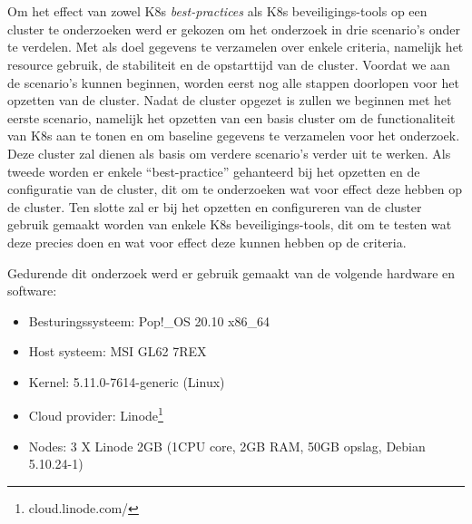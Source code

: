 
\chapter{}
\label{ch:methodologie}

Om het effect van zowel K8s \textit{best-practices} als K8s beveiligings-tools op een cluster te onderzoeken werd er gekozen om het onderzoek in drie scenario's onder te verdelen. Met als doel gegevens te verzamelen over enkele criteria, namelijk het resource gebruik, de stabiliteit en de opstarttijd van de cluster. Voordat we aan de scenario's kunnen beginnen, worden eerst nog alle stappen doorlopen voor het opzetten van de cluster. Nadat de cluster opgezet is zullen we beginnen met het eerste scenario, namelijk het opzetten van een basis cluster om de functionaliteit van K8s aan te tonen en om baseline gegevens te verzamelen voor het onderzoek. Deze cluster zal dienen als basis om verdere scenario's verder uit te werken. Als tweede worden er enkele ``best-practice'' gehanteerd bij het opzetten en de configuratie van de cluster, dit om te onderzoeken wat voor effect deze hebben op de cluster. Ten slotte zal er bij het opzetten en configureren van de cluster gebruik gemaakt worden van enkele K8s beveiligings-tools, dit om te testen wat deze precies doen en wat voor effect deze kunnen hebben op de criteria. 

Gedurende dit onderzoek werd er gebruik gemaakt van de volgende hardware en software:

\begin{itemize}
	\item Besturingssysteem: Pop!\_OS 20.10 x86\_64
	\item Host systeem: MSI GL62 7REX
	\item Kernel: 5.11.0-7614-generic (Linux)
	\item Cloud provider: Linode\footnote{cloud.linode.com/}
	\item Nodes: 3 X Linode 2GB (1CPU core, 2GB RAM, 50GB opslag, Debian 5.10.24-1)
\end{itemize}

